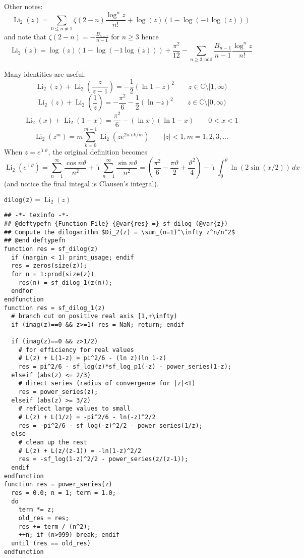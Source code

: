 \documentclass[10pt,dvipdfmx,letterpaper,twoside]{article}
\let\O=\operatorname
\newcommand{\CC}{{\mathbb{C}}}
\newcommand{\ii}{{\hat{\imath}}}
\newenvironment{implementation}{\noindent\begin{framed}}{\end{framed}}
\let\theta=\vartheta
\begin{document}
Other notes:
\[ \O{Li}_2(z) = \sum_{0\leq n\neq1} \zeta(2-n)\frac{\log^n z}{n!} + \log(z)(1-\log(-1\log(z))) \]
and note that $\zeta(2-n) = -\frac{B_{n-1}}{n-1}$ for $n\geq3$ hence
\[ \O{Li}_2(z) = \log(z)(1-\log(-1\log(z))) + \frac{\pi^2}{12} - \sum_{n\geq3, \text{odd}} \frac{B_{n-1}}{n-1}\frac{\log^n z}{n!} \]


\begin{implementation}
Many identities are useful:
\[ \O{Li}_2(z) + \O{Li}_2(\frac{z}{z-1}) = -\frac12(\ln 1-z)^2 \qquad z\in\CC\setminus[1,\infty) \]
\[ \O{Li}_2(z) + \O{Li}_2(\frac{1}{z}) = -\frac{\pi^2}{6} - \frac12(\ln{-z})^2 \qquad z\in\CC\setminus[0,\infty) \]
\[ \O{Li}_2(x) + \O{Li}_2(1-x) = \frac{\pi^2}{6} - (\ln x)(\ln 1-x) \qquad 0<x<1 \]
\[ \O{Li}_2(z^m) = m\sum_{k=0}^{m-1}\O{Li}_2(z e^{2\pi\ii k/m}) \qquad |z|<1, m=1,2,3,\dots \]
When $z=e^{\ii\theta}$, the original definition becomes
\[ \O{Li}_2(e^{\ii\theta}) = \sum_{n=1}^\infty\frac{\cos n\theta}{n^2} + \ii\sum_{n=1}^\infty\frac{\sin n\theta}{n^2}
    = (\frac{\pi^2}{6} - \frac{\pi\theta}{2} + \frac{\theta^2}{4}) - \ii\int_0^\theta \ln(2\sin(x/2))\,dx \]
(and notice the final integal is Clausen's integral).
\end{implementation}

\begin{titled-frame}{{\tt dilog(z)}${}=\O{Li}_2(z)$}
\small%
\begin{verbatim}
## -*- texinfo -*-
## @deftypefn {Function File} {@var{res} =} sf_dilog (@var{z})
## Compute the dilogarithm $Di_2(z) = \sum_(n=1)^\infty z^n/n^2$
## @end deftypefn
function res = sf_dilog(z)
  if (nargin < 1) print_usage; endif
  res = zeros(size(z));
  for n = 1:prod(size(z))
    res(n) = sf_dilog_1(z(n));
  endfor
endfunction
function res = sf_dilog_1(z)
  # branch cut on positive real axis [1,+\infty)
  if (imag(z)==0 && z>=1) res = NaN; return; endif

  if (imag(z)==0 && z>1/2)
    # for efficiency for real values
    # L(z) + L(1-z) = pi^2/6 - (ln z)(ln 1-z)
    res = pi^2/6 - sf_log(z)*sf_log_p1(-z) - power_series(1-z);
  elseif (abs(z) <= 2/3)
    # direct series (radius of convergence for |z|<1)
    res = power_series(z);
  elseif (abs(z) >= 3/2)
    # reflect large values to small
    # L(z) + L(1/z) = -pi^2/6 - ln(-z)^2/2
    res = -pi^2/6 - sf_log(-z)^2/2 - power_series(1/z);
  else
    # clean up the rest
    # L(z) + L(z/(z-1)) = -ln(1-z)^2/2
    res = -sf_log(1-z)^2/2 - power_series(z/(z-1));
  endif
endfunction
function res = power_series(z)
  res = 0.0; n = 1; term = 1.0;
  do
    term *= z;
    old_res = res;
    res += term / (n^2);
    ++n; if (n>999) break; endif
  until (res == old_res)
endfunction
\end{verbatim}
\end{titled-frame}
\end{document}
